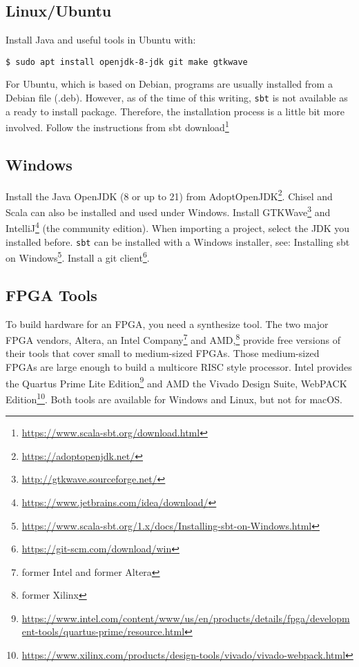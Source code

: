 \documentclass[%
    10pt,
    headinclude, footexclude,
    openright, %
    notitlepage,
    cleardoubleempty,
    headsepline,
    pointlessnumbers,
    bibtotoc, idxtotoc,
    ]{scrbook}
\newcommand{\code}[1]{{\lstinline[basicstyle=\small\ttfamily]{#1}}}
\newcommand{\myref}[2]{\href{#1}{#2}}
\renewcommand{\myref}[2]{{#2}{\footnote{\url{#1}}}}
\begin{document}
\subsection{Linux/Ubuntu}

Install Java and useful tools in Ubuntu with:
\begin{verbatim}
$ sudo apt install openjdk-8-jdk git make gtkwave
\end{verbatim}

For Ubuntu, which is based on Debian, programs are usually installed from a
Debian file (.deb). However, as of the time of this writing, \code{sbt} is not
available as a ready to install package. Therefore, the installation process
is a little bit more involved.
Follow the instructions from \myref{https://www.scala-sbt.org/download.html}{sbt download}

\subsection{Windows}

Install the Java OpenJDK (8 or up to 21) from \myref{https://adoptopenjdk.net/}{AdoptOpenJDK}.
Chisel and Scala can also be installed and used under Windows.
Install \myref{http://gtkwave.sourceforge.net/}{GTKWave} and
\myref{https://www.jetbrains.com/idea/download/}{IntelliJ} (the community edition).
When importing a project, select the JDK you installed before.
\code{sbt} can be installed with a Windows installer, see:
\myref{https://www.scala-sbt.org/1.x/docs/Installing-sbt-on-Windows.html}{Installing sbt on Windows}.
Install a \myref{https://git-scm.com/download/win}{git client}.

\subsection{FPGA Tools}

To build hardware for an FPGA, you need a synthesize tool. The two major
FPGA vendors, Altera, an Intel Company\footnote{former Intel and former Altera}
and AMD,\footnote{former Xilinx} provide free versions of
their tools that cover small to medium-sized FPGAs. Those medium-sized
FPGAs are large enough to build a multicore RISC style processor.
Intel provides the \myref{https://www.intel.com/content/www/us/en/products/details/fpga/development-tools/quartus-prime/resource.html}{Quartus Prime Lite Edition} and AMD the
\myref{https://www.xilinx.com/products/design-tools/vivado/vivado-webpack.html}{Vivado Design Suite, WebPACK Edition}.
Both tools are available for Windows and Linux, but not for macOS.
\end{document}
